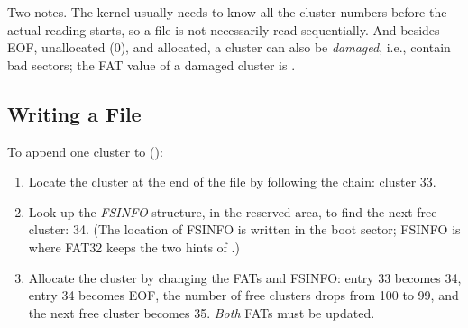 Two notes. The kernel usually needs to know all the cluster numbers before the actual reading starts, so a file is not necessarily read sequentially. And besides EOF, unallocated ($0$), and allocated, a cluster can also be \emph{damaged}, i.e., contain bad sectors; the FAT value of a damaged cluster is .

\subsection{Writing a File}

To append one cluster to  ():
\begin{enumerate}
  \item Locate the cluster at the end of the file by following the chain: cluster 33.
  \item Look up the \emph{FSINFO} structure, in the reserved area, to find the next free cluster: 34. (The location of FSINFO is written in the boot sector; FSINFO is where FAT32 keeps the two hints of .)
  \item Allocate the cluster by changing the FATs and FSINFO: entry 33 becomes 34, entry 34 becomes EOF, the number of free clusters drops from 100 to 99, and the next free cluster becomes 35. \emph{Both} FATs must be updated.
\end{enumerate}

